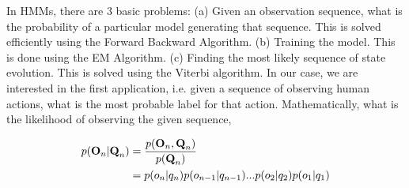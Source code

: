 \documentclass{article}
\begin{document}
In HMMs, there are 3 basic problems: (a) Given an observation sequence, what is the probability of a particular model generating that sequence.  This is solved efficiently using the Forward Backward Algorithm. (b) Training the model.  This is done using the EM Algorithm.  (c) Finding the most likely sequence of state evolution.  This is solved using the Viterbi algorithm.  In our case, we are interested in the first application, i.e. given a sequence of observing human actions, what is the most probable label for that action.  Mathematically, what is the likelihood of observing the given sequence,
%
%

\begin{align}
	\label{eq:HMM_problem1_evaluation_ie_likelihood1}
	p(\textbf{O}_n| \textbf{Q}_n) 
	&= \frac{p(\textbf{O}_n, \textbf{Q}_n)				}   	{p(\textbf{Q}_n)}  	\notag	\\
	&= p(o_n| q_n)p(o_{n-1}|q_{n-1}) ... p(o_2|q_2)p(o_1|q_1)		  	
\end{align}
\end{document}
